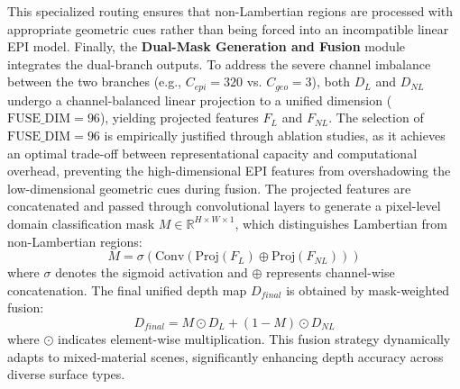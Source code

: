\documentclass[lettersize,journal]{IEEEtran}
\begin{document}
This specialized routing ensures that non-Lambertian regions are processed with appropriate geometric cues rather than being forced into an incompatible linear EPI model. Finally, the \textbf{Dual-Mask Generation and Fusion} module integrates the dual-branch outputs. To address the severe channel imbalance between the two branches (e.g., $C_{epi}=320$ vs. $C_{geo}=3$), both $D_L$ and $D_{NL}$ undergo a channel-balanced linear projection to a unified dimension ($\text{FUSE\_DIM}=96$), yielding projected features $F_L$ and $F_{NL}$. The selection of $\text{FUSE\_DIM}=96$ is empirically justified through ablation studies, as it achieves an optimal trade-off between representational capacity and computational overhead, preventing the high-dimensional EPI features from overshadowing the low-dimensional geometric cues during fusion. The projected features are concatenated and passed through convolutional layers to generate a pixel-level domain classification mask $M \in \mathbb{R}^{H \times W \times 1}$, which distinguishes Lambertian from non-Lambertian regions:
\begin{equation}
M = \sigma(\text{Conv}(\text{Proj}(F_L) \oplus \text{Proj}(F_{NL})))
\end{equation}
where $\sigma$ denotes the sigmoid activation and $\oplus$ represents channel-wise concatenation. The final unified depth map $D_{final}$ is obtained by mask-weighted fusion:
\begin{equation}
D_{final} = M \odot D_L + (1-M) \odot D_{NL}
\end{equation}
where $\odot$ indicates element-wise multiplication. This fusion strategy dynamically adapts to mixed-material scenes, significantly enhancing depth accuracy across diverse surface types.
\end{document}
